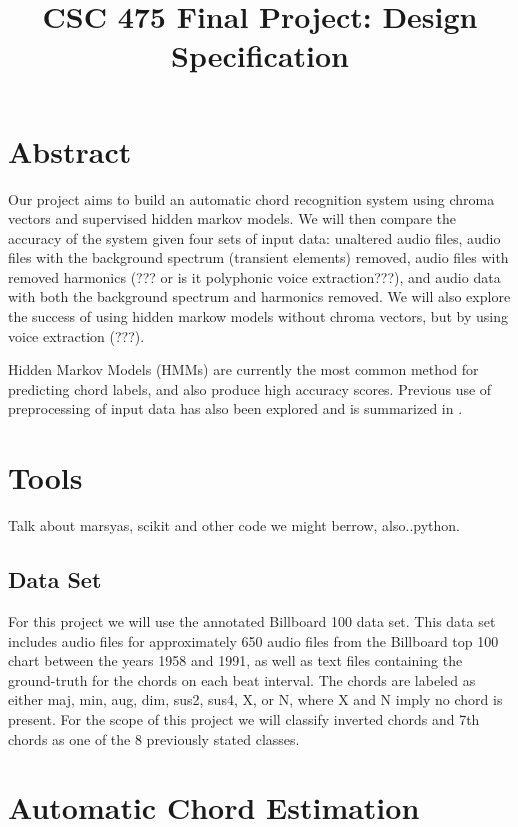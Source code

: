 \documentclass{article}
\title{CSC 475 Final Project: Design Specification}
\begin{document}
%
\maketitle
%

\section{Abstract}\label{sec:desoutline}
Our project aims to build an automatic chord recognition system using chroma
vectors and supervised hidden markov models. We will then compare the accuracy
of the system given four sets of input data: unaltered audio files, audio files
with the background spectrum (transient elements) removed, audio files with
removed harmonics (??? or is it polyphonic voice extraction???), and audio data
with both the background spectrum and harmonics removed. We will also explore
the success of using hidden markow models without chroma vectors, but by using
voice extraction (???).

Hidden Markov Models (HMMs) are currently the most common method for predicting
chord labels, and also produce high accuracy scores. Previous use of
preprocessing of input data has also been explored and is summarized in
\cite{McVicar:00}.

\section{Tools}\label{sec:tools}

Talk about marsyas, scikit and other code we might berrow, also..python.

\subsection{Data Set}

For this project we will use the annotated Billboard 100 data set. This data
set includes audio files for approximately 650 audio files from the Billboard
top 100 chart between the years 1958 and 1991, as well as text files containing
the ground-truth for the chords on each beat interval\cite{Burgoyne:07}. The
chords are labeled as either maj, min, aug, dim, sus2, sus4, X, or N, where X
and N imply no chord is present. For the scope of this project we will classify
inverted chords and 7th chords as one of the 8 previously stated classes.

\section{Automatic Chord Estimation}
\end{document}
